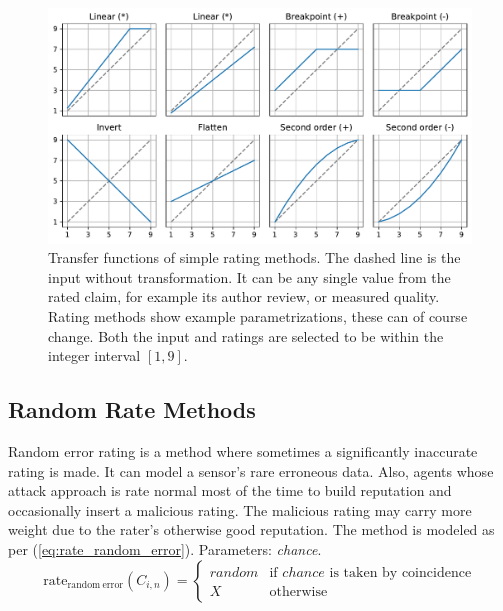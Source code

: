 \documentclass[%
    ]{\PathToTumTemplate/thesis/tum_thesis}
\begin{document}
\begin{figure}[tbp]
  \begin{center}
    \includegraphics[width=1\linewidth]{../images/simple_rate_strategies2.pdf}
    \caption{
    Transfer functions of simple rating methods.
    The dashed line is the input without transformation.
    It can be any single value from the rated claim, for example its author review, or measured quality.
    Rating methods show example parametrizations, these can of course change.
    Both the input and ratings are selected to be within the integer interval $[1,9]$.
    }
    \label{fig:simple_rate_strategies}
  \end{center}
\end{figure}


\subsection{Random Rate Methods}
Random error rating is a method where sometimes a significantly inaccurate rating is made.
	It can model a sensor's rare erroneous data.
Also, agents whose attack approach is rate normal most of the time to build reputation and occasionally insert a malicious rating.
The malicious rating may carry more weight due to the rater's otherwise good reputation.
The method is modeled as per (\ref{eq:rate_random_error}).
Parameters: \emph{chance}.
\begin{equation}\label{eq:rate_random_error}
\mathrm{rate_{random~error}}(C_{i,n}) = 
\begin{cases}
random & \text{if $chance$ is taken by coincidence} \\
X & \text{otherwise}
\end{cases}
\end{equation}
\end{document}

